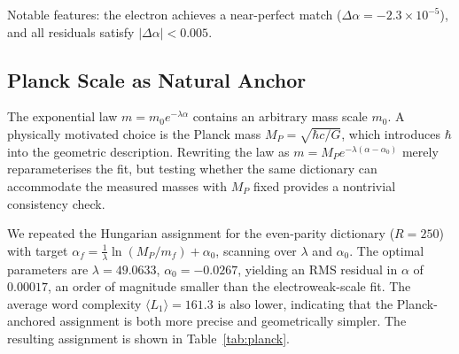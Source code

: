\documentclass[11pt,a4paper]{article}
\begin{document}
Notable features: the electron achieves a near-perfect match ($\Delta\alpha = -2.3\times10^{-5}$), and all residuals satisfy $|\Delta\alpha| < 0.005$.

\subsection{Planck Scale as Natural Anchor}

The exponential law $m = m_0 e^{-\lambda\alpha}$ contains an arbitrary mass scale $m_0$. A physically motivated choice is the Planck mass $M_P = \sqrt{\hbar c/G}$, which introduces $\hbar$ into the geometric description. Rewriting the law as $m = M_P e^{-\lambda(\alpha-\alpha_0)}$ merely reparameterises the fit, but testing whether the same dictionary can accommodate the measured masses with $M_P$ fixed provides a nontrivial consistency check.

We repeated the Hungarian assignment for the even-parity dictionary ($R=250$) with target $\alpha_f = \frac{1}{\lambda}\ln(M_P/m_f) + \alpha_0$, scanning over $\lambda$ and $\alpha_0$. The optimal parameters are $\lambda = 49.0633$, $\alpha_0 = -0.0267$, yielding an RMS residual in $\alpha$ of $0.00017$, an order of magnitude smaller than the electroweak-scale fit. The average word complexity $\langle L_1\rangle = 161.3$ is also lower, indicating that the Planck-anchored assignment is both more precise and geometrically simpler. The resulting assignment is shown in Table~\ref{tab:planck}.
\end{document}
